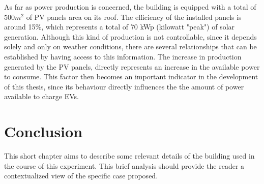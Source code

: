 As far as power production is concerned, the building is equipped with a total of 500$m^2$ of \ac{PV} panels area on its roof. The efficiency of the installed panels is around 15$\%$, which represents a total of 70 kWp (kilowatt "peak") of solar generation. Although this kind of production is not controllable, since it depends solely and only on weather conditions, there are several relationships that can be established by having access to this information. The increase in production generated by the \ac{PV} panels, directly represents an increase in the available power to consume. This factor then becomes an important indicator in the development of this thesis, since its behaviour directly influences the the amount of power available to charge \ac{EV}s.






\section{Conclusion}

This short chapter aims to describe some relevant details of the building used in the course of this experiment. This brief analysis should provide the reader a contextualized view of the specific case proposed.